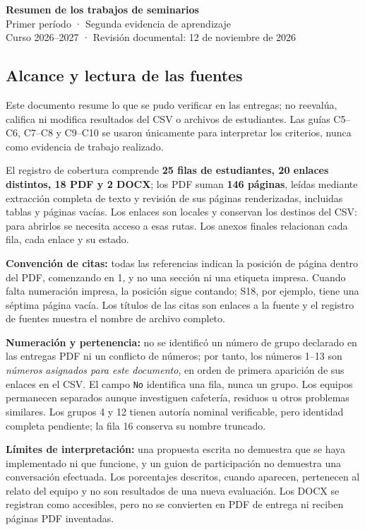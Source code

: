 \documentclass[11pt,a4paper]{article}
\begin{document}
\begin{center}
{\LARGE\bfseries\color{Ink} Resumen de los trabajos de seminarios}\\[5pt]
{\large Primer período · Segunda evidencia de aprendizaje}\\[3pt]
Curso 2026--2027 · Revisión documental: 12 de noviembre de 2026
\end{center}

\subsection*{Alcance y lectura de las fuentes}
Este documento resume lo que se pudo verificar en las entregas; no reevalúa, califica ni modifica resultados del CSV o archivos de estudiantes. Las guías C5--C6, C7--C8 y C9--C10 se usaron únicamente para interpretar los criterios, nunca como evidencia de trabajo realizado.

El registro de cobertura comprende \textbf{25 filas de estudiantes, 20 enlaces distintos, 18 PDF y 2 DOCX}; los PDF suman \textbf{146 páginas}, leídas mediante extracción completa de texto y revisión de sus páginas renderizadas, incluidas tablas y páginas vacías. Los enlaces son locales y conservan los destinos del CSV: para abrirlos se necesita acceso a esas rutas. Los anexos finales relacionan cada fila, cada enlace y su estado.

\textbf{Convención de citas:} todas las referencias indican la posición de página dentro del PDF, comenzando en 1, y no una sección ni una etiqueta impresa. Cuando falta numeración impresa, la posición sigue contando; S18, por ejemplo, tiene una séptima página vacía. Los títulos de las citas son enlaces a la fuente y el registro de fuentes muestra el nombre de archivo completo.

\textbf{Numeración y pertenencia:} no se identificó un número de grupo declarado en las entregas PDF ni un conflicto de números; por tanto, los números 1--13 son \textit{números asignados para este documento}, en orden de primera aparición de sus enlaces en el CSV. El campo \texttt{No} identifica una fila, nunca un grupo. Los equipos permanecen separados aunque investiguen cafetería, residuos u otros problemas similares. Los grupos 4 y 12 tienen autoría nominal verificable, pero identidad completa pendiente; la fila 16 conserva su nombre truncado.

\textbf{Límites de interpretación:} una propuesta escrita no demuestra que se haya implementado ni que funcione, y un guion de participación no demuestra una conversación efectuada. Los porcentajes descritos, cuando aparecen, pertenecen al relato del equipo y no son resultados de una nueva evaluación. Los DOCX se registran como accesibles, pero no se convierten en PDF de entrega ni reciben páginas PDF inventadas.
\end{document}
